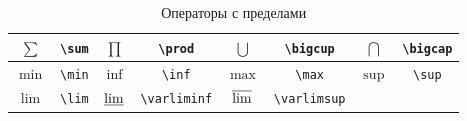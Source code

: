 \begin{table}
	\begin{tabular}{||c|c||c|c||c|c||c|c||}
		\hline $\sum$ & \Verb|\sum| 
		& $\prod$ & \Verb|\prod| 
		& $\bigcup$ & \Verb|\bigcup| 
		& $\bigcap$ & \Verb|\bigcap| \\
		\hline  $\min$ & \Verb|\min| 
		& $\inf$ & \Verb|\inf| 
		& $\max$ & \Verb|\max| 
		& $\sup$ & \Verb|\sup| \\ 
		\hline $\lim$ & \Verb|\lim| 
		& $\varliminf$ & \Verb|\varliminf| 
		& $\varlimsup$ & \Verb|\varlimsup| 
		& & \\
		\hline
	\end{tabular}
	\caption{Операторы с пределами}
\end{table}